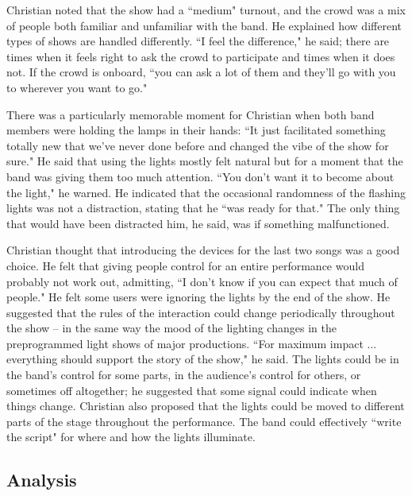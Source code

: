 Christian noted that the show had a ``medium" turnout, and the crowd was a mix of people both familiar and unfamiliar with the band. He explained how different types of shows are handled differently. ``I feel the difference," he said; there are times when it feels right to ask the crowd to participate and times when it does not. If the crowd is onboard, ``you can ask a lot of them and they'll go with you to wherever you want to go."

There was a particularly memorable moment for Christian when both band members were holding the lamps in their hands: ``It just facilitated something totally new that we've never done before and changed the vibe of the show for sure." He said that using the lights mostly felt natural but for a moment that the band was giving them too much attention. ``You don't want it to become about the light," he warned. He indicated that the occasional randomness of the flashing lights was not a distraction, stating that he ``was ready for that." The only thing that would have been distracted him, he said, was if something malfunctioned.

Christian thought that introducing the devices for the last two songs was a good choice. He felt that giving people control for an entire performance would probably not work out, admitting, ``I don't know if you can expect that much of people." He felt some users were ignoring the lights by the end of the show. He suggested that the rules of the interaction could change periodically throughout the show -- in the same way the mood of the lighting changes in the preprogrammed light shows of major productions. ``For maximum impact ... everything should support the story of the show," he said. The lights could be in the band's control for some parts, in the audience's control for others, or sometimes off altogether; he suggested that some signal could indicate when things change. Christian also proposed that the lights could be moved to different parts of the stage throughout the performance. The band could effectively ``write the script" for where and how the lights illuminate.

\subsection{Analysis}

